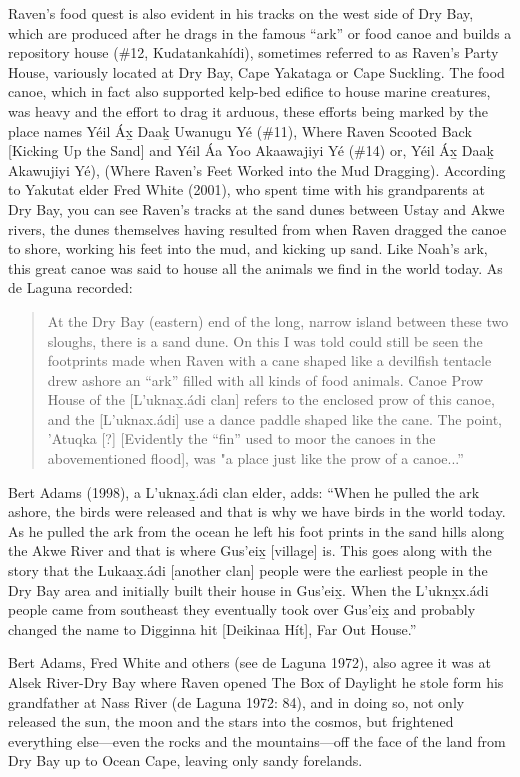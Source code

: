 Raven’s food quest is also evident in his tracks on the west side of Dry Bay, which are produced after he drags in the famous “ark” or food canoe and builds a repository house (\#12, Kudatankahídi), sometimes referred to as Raven’s Party House, variously located at Dry Bay, Cape Yakataga or Cape Suckling.  The food canoe, which in fact also supported kelp-bed edifice to house marine creatures, was heavy and the effort to drag it arduous, these efforts being marked by the place names Yéil Áx̲ Daak̲ Uwanugu Yé (\#11), Where Raven Scooted Back [Kicking Up the Sand] and Yéil Áa Yoo Akaawajiyi Yé  (\#14) or, Yéil Áx̲ Daak̲ Akawujiyi Yé), (Where Raven’s Feet Worked into the Mud Dragging).  According to Yakutat elder Fred White (2001), who spent time with his grandparents at Dry Bay, you can see Raven’s tracks at the sand dunes between Ustay and Akwe rivers, the dunes themselves having resulted from when Raven dragged the canoe to shore, working his feet into the mud, and kicking up sand.  Like Noah’s ark, this great canoe was said to house all the animals we find in the world today.  As de Laguna recorded:

\begin{quote}
    At the Dry Bay (eastern) end of the long, narrow island between these two sloughs, there is a sand dune. On this I was told could still be seen the footprints made when Raven with a cane shaped like a devilfish tentacle drew ashore an ``ark'' filled with all kinds of food animals. Canoe Prow House of the [L’uknax̲.ádi clan] refers to the enclosed prow of this canoe, and the [L’uknax.ádi] use a dance paddle shaped like the cane. The point, 'Atuqka [?] [Evidently the “fin” used to moor the canoes in the abovementioned flood], was "a place just like the prow of a canoe...”
\end{quote}

Bert Adams (1998), a L’uknax̲.ádi clan elder, adds: “When he pulled the ark ashore, the birds were released and that is why we have birds in the world today.  As he pulled the ark from the ocean he left his foot prints in the sand hills along the Akwe River and that is where Gus'eix̲ [village] is. This goes along with the story that the Lukaax̲.ádi [another clan] people were the earliest people in the Dry Bay area and initially built their house in Gus'eix̲. When the L’uknx̲x.ádi people came from southeast they eventually took over Gus'eix̲ and probably changed the name to Digginna hit [Deikinaa Hít], Far Out House.”

Bert Adams, Fred White and others (see de Laguna 1972), also agree it was at Alsek River-Dry Bay where Raven opened The Box of Daylight he stole form his grandfather at Nass River (de Laguna 1972: 84), and in doing so, not only released the sun, the moon and the stars into the cosmos, but frightened everything else—even the rocks and the mountains---off the face of the land from Dry Bay up to Ocean Cape, leaving only sandy forelands.


